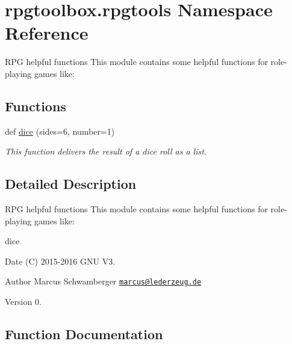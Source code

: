 \hypertarget{namespacerpgtoolbox_1_1rpgtools}{}\section{rpgtoolbox.\+rpgtools Namespace Reference}
\label{namespacerpgtoolbox_1_1rpgtools}


R\+PG helpful functions This module contains some helpful functions for role-\/playing games like\+:  


\subsection*{Functions}
\begin{DoxyCompactItemize}
\item 
def \hyperlink{namespacerpgtoolbox_1_1rpgtools_a405b792a833748c8189ac5705edb47d5}{dice} (sides=6, number=1)
\begin{DoxyCompactList}\small\item\em This function delivers the result of a dice roll as a list. \end{DoxyCompactList}\end{DoxyCompactItemize}


\subsection{Detailed Description}
R\+PG helpful functions This module contains some helpful functions for role-\/playing games like\+: 

\begin{DoxyItemize}
\item dice\end{DoxyItemize}
\begin{DoxyDate}{Date}
(C) 2015-\/2016  G\+NU V3. 
\end{DoxyDate}
\begin{DoxyAuthor}{Author}
Marcus Schwamberger  \href{mailto:marcus@lederzeug.de}{\tt marcus@lederzeug.\+de} 
\end{DoxyAuthor}
\begin{DoxyVersion}{Version}
0. 
\end{DoxyVersion}


\subsection{Function Documentation}
